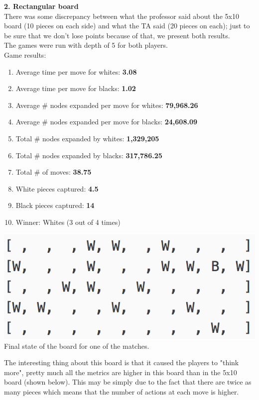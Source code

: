 \documentclass[11pt]{article}
\begin{document}
\textbf{2. Rectangular board}\\
There was some discrepancy between what the professor said about the 5x10 board (10 pieces on each side) and what the TA said (20 pieces on each); just to be sure that we don't lose points because of that, we present both results.\\

The games were run with depth of 5 for both players.\\

Game results:\\
\begin{enumerate}
\item Average time per move for whites: \textbf{3.08}
\item Average time per move for blacks: \textbf{1.02}
\item Average \# nodes expanded per move for whites: \textbf{79,968.26}
\item Average \# nodes expanded per move for blacks:  \textbf{24,608.09}
\item Total \# nodes expanded by whites: \textbf{1,329,205}
\item Total \# nodes expanded by blacks: \textbf{317,786.25}
\item Total \# of moves: \textbf{38.75}
\item White pieces captured: \textbf{4.5}
\item Black pieces captured: \textbf{14}
\item Winner: Whites (3 out of 4 times)
\end{enumerate}
\begin{center}
\includegraphics[scale=1]{part2/ab-01-vs-ab-d1-rect5x10.png}\\
Final state of the board for one of the matches.
\end{center}
The interesting thing about this board is that it caused the players to "think more", pretty much all the metrics are higher in this board than in the 5x10 board (shown below). This may be simply due to the fact that there are twice as many pieces which means that the number of actions at each move is higher.\\
\end{document}
